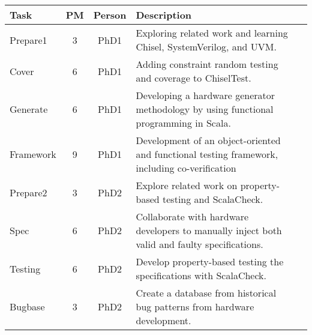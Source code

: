 \documentclass[fleqn,12pt]{article}
\begin{document}
%


\begin{table*}%
{\small
  \begin{center}
    \begin{tabular}{lccp{110mm}l}
      \toprule
      Task                   & PM  & Person    & Description                                                                                   \\
      \midrule
      Prepare1                & 3   & PhD1      & Exploring related work and learning Chisel, SystemVerilog, and UVM.                           \\
      Cover                  & 6   & PhD1      & Adding constraint random testing and coverage to ChiselTest.                     \\
      Generate               & 6   & PhD1      & Developing a hardware generator methodology by using functional programming in Scala.         \\
      Framework              & 9   & PhD1      & Development of an object-oriented and functional testing framework, including co-verification                     \\
      \midrule
      Prepare2                    & 3   & PhD2      & Explore related work on property-based testing and ScalaCheck.                   \\
      Spec          & 6   & PhD2      & Collaborate with hardware developers to manually inject both valid and faulty specifications. \\
      Testing & 6   & PhD2      & Develop property-based testing the specifications with ScalaCheck.                                                      \\
      Bugbase           & 3   & PhD2      & Create a database from historical bug patterns from hardware development.                   \\

\end{tabular}
\end{center}}
\end{table*}
\end{document}
